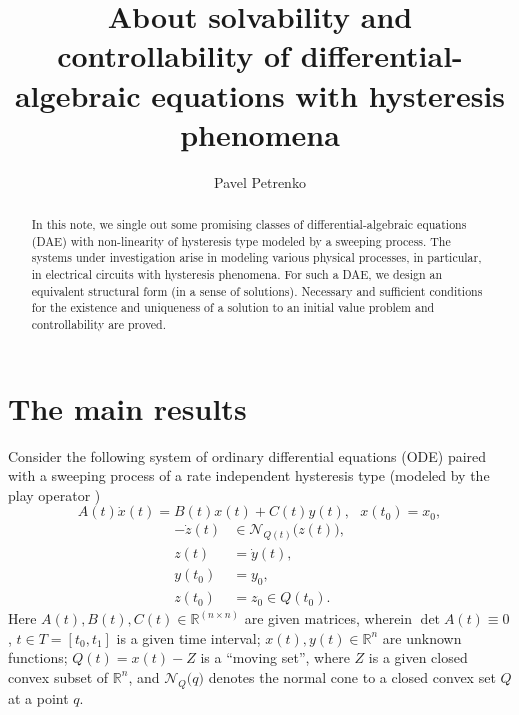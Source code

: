 \documentclass[12pt]{llncs}
\begin{document}
\fi

\title{About solvability and controllability of differential-algebraic equations with hysteresis phenomena}%

\author{Pavel Petrenko
}

\maketitle

\begin{abstract}
In this note, we single out some promising classes of differential-algebraic equations (DAE) with non-linearity of hysteresis type modeled by a sweeping process. The systems under investigation arise in modeling various physical processes, in particular, in electrical circuits with hysteresis phenomena. For such a DAE, we design an equivalent structural form (in a sense of solutions). Necessary and sufficient conditions for the existence and uniqueness of a solution to an initial value problem and controllability are proved.

\end{abstract}


\section{The main results} %


Consider the following system of ordinary differential equations (ODE) paired with a sweeping process \cite{KM2000,Moreau1977} of a rate independent hysteresis type (modeled by the play operator \cite{BS1996,Kr1991,PSS2020})
\begin{equation} \label{pss1}
	A(t)\dot{x}(t)=B(t)x(t)+C(t)y(t), \ \ \ x(t_0)=x_0,
\end{equation}
\begin{equation}\label{pss2}
  \begin{aligned}
	-\dot{z}(t)&\in \mathcal{N}_{Q(t)}\big(z(t)\big),  \\ z(t) &= \dot{y}(t), \\
	{y}(t_0)&=y_0, \\ z(t_0)&=z_0\in Q(t_0).
  \end{aligned}
\end{equation}
Here $A(t), B(t), C(t) \in \mathbb R^{(n\times n)}$ are given matrices, wherein $\det A(t) \equiv 0$, $t \in T=[t_0,t_1]$ is a given time interval; $x(t), y(t) \in {\mathbb R}^n$ are unknown functions; $Q(t)=x(t)-Z$ is a ``moving set'', where $Z$ is a given closed convex subset of ${\mathbb R}^n$, and $\mathcal{N}_{Q}\big(q\big)$ denotes the normal cone to a closed convex set $Q$ at a point $q$.
\end{document}
